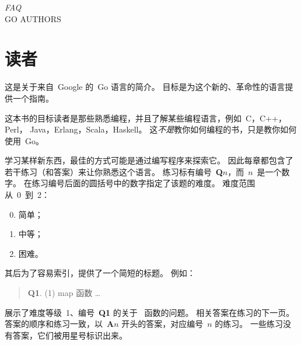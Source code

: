 {\textit{FAQ}\\ \textsc{GO AUTHORS}}

\section{读者}
\noindent{}这是关于来自~Google 的~Go 语言的简介。
目标是为这个新的、革命性的语言提供一个指南。

这本书的目标读者是那些熟悉编程，并且了解某些编程语言，例如~C\cite{c}，C++\cite{c++}，\\ 
Perl\cite{perl}， Java\cite{java}，Erlang\cite{erlang}，Scala\cite{scala}，Haskell\cite{haskell}。
这\emph{不是}教你如何编程的书，只是教你如何使用~Go。

学习某样新东西，最佳的方式可能是通过编写程序来探索它。
因此每章都包含了若干练习（和答案）来让你熟悉这个语言。
练习标有编号~\textbf{Q$n$}，而~$n$~是一个数字。 
在练习编号后面的圆括号中的数字指定了该题的难度。
难度范围从~0~到~2：
\begin{enumerate}
\setcounter{enumi}{-1}
\item 简单；
\item 中等；
\item 困难。
\end{enumerate}

其后为了容易索引，提供了一个简短的标题。
例如：
\begin{verse}
\textbf{Q1}. (1) map 函数 \ldots
\end{verse}
展示了难度等级~1、编号~\textbf{Q1} 的关于~ 函数的问题。
相关答案在练习的下一页。
答案的顺序和练习一致，以~\textbf{A$n$} 开头的答案，对应编号~$n$ 的练习。
一些练习没有答案，它们被用星号标识出来。

